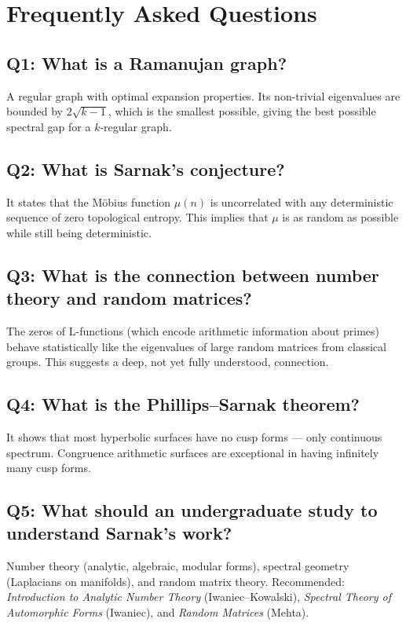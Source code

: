 \section{Frequently Asked Questions}

\subsection*{Q1: What is a Ramanujan graph?}
A regular graph with optimal expansion properties. Its non-trivial eigenvalues are bounded by $2\sqrt{k-1}$, which is the smallest possible, giving the best possible spectral gap for a $k$-regular graph.

\subsection*{Q2: What is Sarnak's conjecture?}
It states that the M\"obius function $\mu(n)$ is uncorrelated with any deterministic sequence of zero topological entropy. This implies that $\mu$ is as random as possible while still being deterministic.

\subsection*{Q3: What is the connection between number theory and random matrices?}
The zeros of L-functions (which encode arithmetic information about primes) behave statistically like the eigenvalues of large random matrices from classical groups. This suggests a deep, not yet fully understood, connection.

\subsection*{Q4: What is the Phillips--Sarnak theorem?}
It shows that most hyperbolic surfaces have no cusp forms — only continuous spectrum. Congruence arithmetic surfaces are exceptional in having infinitely many cusp forms.

\subsection*{Q5: What should an undergraduate study to understand Sarnak's work?}
Number theory (analytic, algebraic, modular forms), spectral geometry (Laplacians on manifolds), and random matrix theory. Recommended: \textit{Introduction to Analytic Number Theory} (Iwaniec--Kowalski), \textit{Spectral Theory of Automorphic Forms} (Iwaniec), and \textit{Random Matrices} (Mehta).

